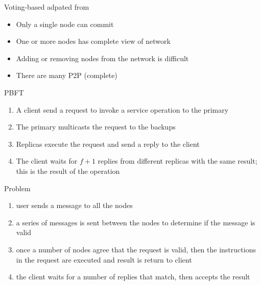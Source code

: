\documentclass[pdf,table]{beamer}
\begin{document}
\begin{frame}{Voting-based adpated from \cite{sawtooth:consensus}}
	\begin{itemize}
		\item Only a single node can commit
		\item One or more nodes has complete view of network
		\item Adding or removing nodes from the network is difficult
		\item There are many P2P (complete)
	\end{itemize}
\end{frame}

\begin{frame}{PBFT \cite{castro1999practical}}
	\begin{enumerate}
		\item A client send a request to invoke a service operation to the primary
		\item The primary multicasts the request to the backups
		\item Replicas execute the request and send a reply to the client
		\item The client waits for $f+1$ replies from different replicas with the same result; this is the result of the operation
	\end{enumerate}
\end{frame}

\begin{frame}{Problem \cite{sawtooth:consensus}}
	\begin{enumerate}
		\item user sends a message to all the nodes
		\item a series of messages is sent between the nodes to determine if the message is valid
		\item once a number of nodes agree that the request is valid, then the instructions in the request are executed and result is return to client
		\item the client waits for a number of replies that match, then accepts the result
	\end{enumerate}
\end{frame}
\end{document}
